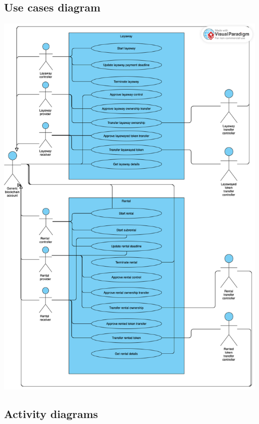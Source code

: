 \documentclass[english, LaM, oneside]{sapthesis}%
\begin{document}
\subsection{Use cases diagram}
\includegraphics[scale=0.4]{useCaseDiagram.png}
\subsection{Activity diagrams}
%
%
%
%
%
%
%
\end{document}
